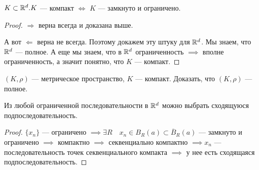 \begin{consequence}
    $K \subset \mathbb{R}^d. K$ --- компакт  $\iff$  $K$ --- замкнуто и ограничено. 
\end{consequence}
\begin{proof}
    $\Rightarrow$ верна всегда и доказана выше.

    А вот  $\Leftarrow$ верна не всегда. Поэтому докажем эту штуку для  $\mathbb{R}^d$. Мы знаем, что  $\mathbb{R}^d$ --- полное. А еще мы знаем, что в  $\mathbb{R}^d$ ограниченность  $\implies$ вполне ограниченность, а значит понятно, что  $K$ --- компакт.
\end{proof}
\begin{exerc}
    $(K, \rho)$ --- метрическое пространство,  $K$ --- компакт. Доказать, что  $(K, \rho)$ --- полное.
\end{exerc}

\begin{theorem}
    Из любой ограниченной последовательности в $\mathbb{R}^d$ можно выбрать сходящуюся подпоследовательность.
\end{theorem}
\begin{proof}
    $\{x_n\}$ --- ограничено $\implies \exists R\quad x_n \in B_R(a) \subset \overline{B}_R(a)$ --- замкнуто и ограничено $\implies$ компактно  $\implies$ секвенциально компактно $\implies x_n$ --- последовательность точек секвенциального компакта  $\implies$ у нее есть сходящаяся подпоследовательность.
\end{proof}
